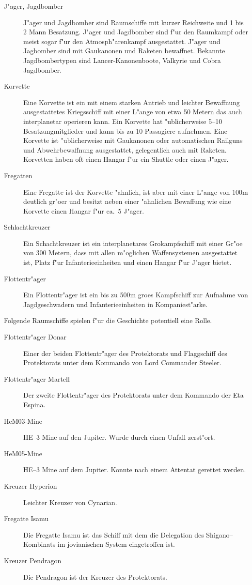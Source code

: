 \begin{description}
\item [J"ager, Jagdbomber] J"ager und Jagdbomber sind Raumschiffe mit kurzer Reichweite und 1 bis 2 Mann Besatzung.
      J"ager und Jagdbomber sind f"ur den Raumkampf oder meist sogar f"ur den Atmosph"arenkampf ausgestattet. J"ager und Jagbomber sind mit Gau\3kanonen und Raketen bewaffnet. Bekannte Jagdbombertypen sind Lancer-Kanonenboote, Valkyrie  und Cobra Jagdbomber.
\item [Korvette] Eine Korvette ist ein mit einem starken Antrieb und leichter Bewaffnung ausgestattetes Kriegsschiff
      mit einer L"ange von etwa 50 Metern das auch interplanetar operieren kann. Ein Korvette hat "ublicherweise 5--10 Besatzungmitglieder und kann bis zu 10 Passagiere aufnehmen. Eine Korvette ist "ublicherweise mit Gau\3kanonen oder automatischen Railguns und Abwehrbewaffnung ausgestattet, gelegentlich auch mit Raketen. Korvetten haben oft einen Hangar f"ur ein Shuttle oder einen J"ager.
\item [Fregatten] Eine Fregatte ist der Korvette "ahnlich, ist aber mit einer L"ange von 100m deutlich gr"o\3er und besitzt
      neben einer "ahnlichen Bewaffung wie eine Korvette einen Hangar f"ur ca.~5 J"ager.
\item [Schlachtkreuzer] Ein Schachtkreuzer ist ein interplanetares Gro\3kampfschiff mit einer Gr"o\3e von 300 Metern,
      dass mit allen m"oglichen Waffensystemen ausgestattet ist, Platz f"ur Infanterieeinheiten und einen Hangar f"ur J"ager bietet.
\item [Flottentr"ager] Ein Flottentr"ager ist ein bis zu 500m gro\3es Kampfschiff zur Aufnahme von
      Jagdgeschwadern und Infanterieeinheiten in Kompaniest"arke.
\end{description}

Folgende Raumschiffe spielen f"ur die Geschichte potentiell eine Rolle.

\begin{description}
\item [Flottentr"ager Donar] Einer der beiden Flottentr"ager des Protektorats und Flaggschiff des Protektorats unter
       dem Kommando von Lord Commander Steeler.
\item [Flottentr"ager Martell] Der zweite Flottentr"ager des Protektorats unter dem Kommando der Eta Espina.
\item [HeM03-Mine] HE--3 Mine auf den Jupiter. Wurde durch einen Unfall zerst"ort.
\item [HeM05-Mine] HE--3 Mine auf dem Jupiter. Konnte nach einem Attentat gerettet werden.
\item [Kreuzer Hyperion] Leichter Kreuzer von Cynarian.
\item [Fregatte Isamu] Die Fregatte Isamu ist das Schiff mit dem die Delegation des Shigano--Kombinats im jovianischen
      System eingetroffen ist.
\item [Kreuzer Pendragon] Die Pendragon ist der Kreuzer des Protektorats.
\end{description}

